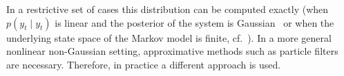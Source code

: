 In a restrictive set of cases this distribution can be computed
exactly (\eg when $p(y_t \mid y_t)$ is linear and the posterior of the
system is Gaussian~\cite[175]{arulampalam} or when the underlying
state space of the Markov model is finite, cf.~\cite[Example
1]{doucet}). In a more general nonlinear non-Gaussian setting,
approximative methods such as particle filters are
necessary. Therefore, in practice a different approach is used.

